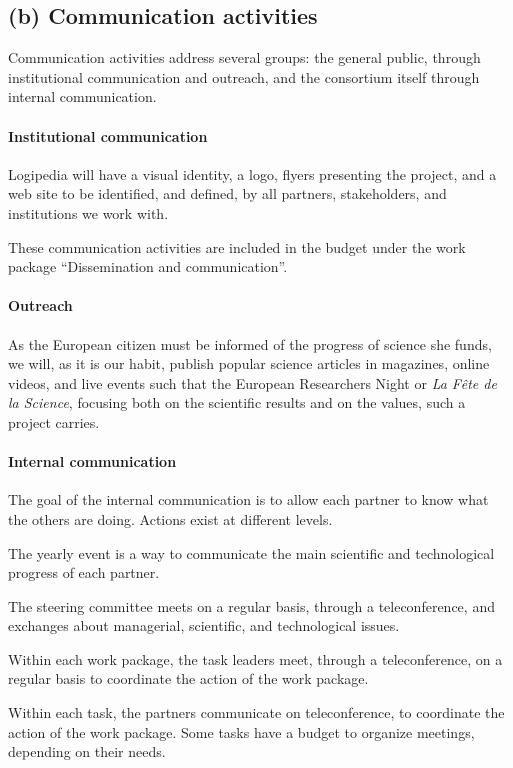 \subsection*{(b) Communication activities}

Communication activities address several groups: the general public, through
institutional communication and outreach, and the consortium itself through
internal communication.

\paragraph*{Institutional communication}

Logipedia will have a visual identity, a logo, flyers presenting the
project, and a web site to be identified, and defined, by all partners,
stakeholders, and institutions we work with.

These communication activities are included in the budget under the
work package ``Dissemination and communication''.

\paragraph*{Outreach}

As the European citizen must be informed of the progress of science
she funds, we will, as it is our habit, publish popular science
articles in magazines, online videos, and live events such that the
European Researchers Night or {\em La Fête de la Science}, focusing
both on the scientific results and on the values, such a project
carries.


\paragraph*{Internal communication}

The goal of the internal communication is to allow each partner to
know what the others are doing. Actions exist at different levels.

\begin{compactitem}
\item The yearly event is a way to communicate the main scientific and
  technological progress of each partner.
\item The steering committee meets on a regular basis, through a
  teleconference, and exchanges about managerial, scientific, and
  technological issues.
\item Within each work package, the task leaders meet, through a
  teleconference, on a regular basis to coordinate the action of the
  work package.
\item Within each task, the partners communicate on teleconference, to
  coordinate the action of the work package. Some tasks have a budget
  to organize meetings, depending on their needs.
\end{compactitem}

